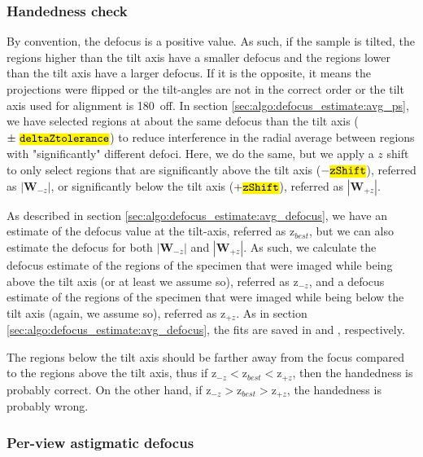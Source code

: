 \subsubsection{Handedness check}

By convention, the defocus is a positive value. As such, if the sample is tilted, the regions higher than the tilt axis have a smaller defocus and the regions lower than the tilt axis have a larger defocus. If it is the opposite, it means the projections were flipped or the tilt-angles are not in the correct order or the tilt axis used for alignment is 180\textdegree\ off. In section \ref{sec:algo:defocus_estimate:avg_ps}, we have selected regions at about the same defocus than the tilt axis ($\pm \ \code{deltaZtolerance}$) to reduce interference in the radial average between regions with "significantly" different defoci. Here, we do the same, but we apply a $z$ shift to only select regions that are significantly above the tilt axis ($-\code{zShift}$), referred as $|\bm{W}_{-z}|$, or significantly below the tilt axis ($+\code{zShift}$), referred as $|\bm{W}_{+z}|$.

As described in section \ref{sec:algo:defocus_estimate:avg_defocus}, we have an estimate of the defocus value at the tilt-axis, referred as $\bm{\mathrm{z}}_{best}$, but we can also estimate the defocus for both $|\bm{W}_{-z}|$ and $|\bm{W}_{+z}|$. As such, we calculate the defocus estimate of the regions of the specimen that were imaged while being above the tilt axis (or at least we assume so), referred as $\bm{\mathrm{z}}_{-z}$, and a defocus estimate of the regions of the specimen that were imaged while being below the tilt axis (again, we assume so), referred as $\bm{\mathrm{z}}_{+z}$. As in section \ref{sec:algo:defocus_estimate:avg_defocus}, the fits are saved in  and , respectively.

The regions below the tilt axis should be farther away from the focus compared to the regions above the tilt axis, thus if $\bm{\mathrm{z}}_{-z} < \bm{\mathrm{z}}_{best} < \bm{\mathrm{z}}_{+z}$, then the handedness is probably correct. On the other hand, if $\bm{\mathrm{z}}_{-z} > \bm{\mathrm{z}}_{best} > \bm{\mathrm{z}}_{+z}$, the handedness is probably wrong.

\subsubsection{Per-view astigmatic defocus} \label{sec:algo:defocus_estimate:per_view_defocus}

